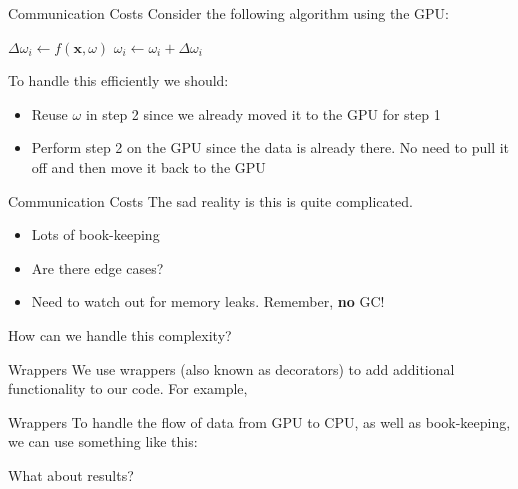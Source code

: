 \documentclass{beamer}
\begin{document}
\begin{frame}{Communication Costs}
  Consider the following algorithm using the GPU:
  \begin{algorithmic}[1]
    \State $\Delta \omega_i \gets f(\mathbf{x}, \omega)$
    \State $\omega_i \gets \omega_i + \Delta \omega_i$
  \end{algorithmic}
  
  To handle this efficiently we should:
  \begin{itemize}
      \pause
    \item Reuse $\omega$ in step 2 since we already moved it to the GPU for step
      1 \pause
    \item Perform step 2 on the GPU since the data is already there. No need to
      pull it off and then move it back to the GPU
  \end{itemize}
\end{frame}

\begin{frame}{Communication Costs}
  The sad reality is this is quite complicated.

  \begin{itemize}
    \item Lots of book-keeping
    \item Are there edge cases?
    \item Need to watch out for memory leaks. Remember, \textbf{no} GC!
  \end{itemize}
\end{frame}

\begin{frame}[standout]
  How can we handle this complexity?
\end{frame}

\begin{frame}{Wrappers}
  We use wrappers (also known as decorators) to add additional functionality to
  our code. For example,
\end{frame}

\begin{frame}{Wrappers}
  To handle the flow of data from GPU to CPU, as well as book-keeping, we can
  use something like this:
\end{frame}

\begin{frame}[standout]
  What about results?
\end{frame}
\end{document}
